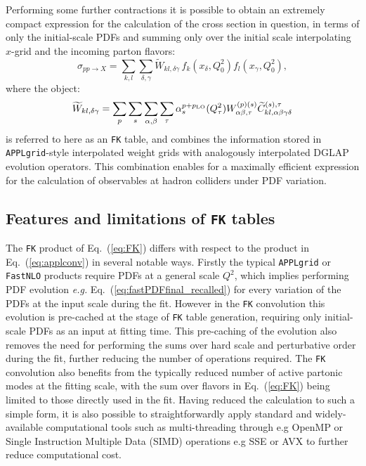 \documentclass[preprint,12pt]{elsarticle}
\begin{document}
Performing some further contractions it is possible to obtain an
extremely compact expression for the calculation of the cross section
in question, in terms of only the initial-scale PDFs and summing only
over the initial scale interpolating $x$-grid and the incoming parton
flavors:
\begin{equation}\label{eq:FK}
  \sigma _{pp\to X} = \sum_{k,l}\sum_{\delta,\gamma} 
  \widetilde{W}_{kl,\delta\gamma} \,f_k(x_\delta,Q^2_0) f_l(x_\gamma,Q^2_0),
\end{equation}
where the object:
\begin{equation}\label{eq:FKTable}
  \widetilde{W}_{kl,\delta\gamma} = \sum_p\sum_{s}\sum_{\alpha,\beta} \sum_{\tau}
\alpha_s^{p+p_{\rm LO}}(Q^2_\tau)  W_{\alpha\beta,\tau}^{(p)(s)} \widetilde{C}^{(s),\tau}_{kl,\alpha\beta\gamma\delta}
\end{equation}
is referred to here as an {\tt FK} table, and combines the information
stored in {\tt APPLgrid}-style interpolated weight grids with
analogously interpolated DGLAP evolution operators. This combination
enables for a maximally efficient expression for the
calculation of observables at hadron colliders under PDF variation.

\subsection{Features and limitations of {\tt FK} tables}

The {\tt FK} product of Eq.~(\ref{eq:FK}) differs with respect to the
product in Eq.~(\ref{eq:applconv}) in several notable ways. Firstly
the typical {\tt APPLgrid} or {\tt FastNLO} products require PDFs at a
general scale $Q^2$, which implies performing PDF evolution {\it e.g.}
Eq.~(\ref{eq:fastPDFfinal_recalled}) for every variation of the PDFs
at the input scale during the fit. However in the {\tt FK} convolution
this evolution is pre-cached at the stage of {\tt FK} table
generation, requiring only initial-scale PDFs as an input at fitting
time. This pre-caching of the evolution also removes the need for
performing the sums over hard scale and perturbative order during the
fit, further reducing the number of operations required. The {\tt FK}
convolution also benefits from the typically reduced number of active
partonic modes at the fitting scale, with the sum over flavors in
Eq.~(\ref{eq:FK}) being limited to those directly used in the
fit. Having reduced the calculation to such a simple form, it is also
possible to straightforwardly apply standard and widely-available
computational tools such as multi-threading through e.g OpenMP or
Single Instruction Multiple Data (SIMD) operations e.g SSE or AVX to
further reduce computational cost.
\end{document}

